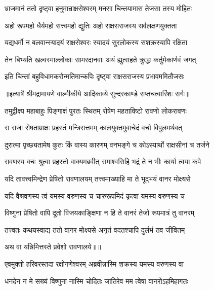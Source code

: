 \twolineshloka
{भ्राजमानं ततो दृष्ट्वा हनुमान्राक्षसेश्वरम्}
{मनसा चिन्तयामास तेजसा तस्य मोहितः} %

\twolineshloka
{अहो रूपमहो धैर्यमहो सत्त्वमहो द्युतिः}
{अहो राक्षसराजस्य सर्वलक्षणयुक्तता} %

\twolineshloka
{यद्यधर्मो न बलवान्स्यादयं राक्षसेश्वरः}
{स्यादयं सुरलोकस्य सशक्रस्यापि रक्षिता} %

\twolineshloka
{तेन बिभ्यति खल्वस्माल्लोकाः सामरदानवाः}
{अयं ह्युत्सहते क्रुद्धः कर्तुमेकार्णवं जगत्} %

\twolineshloka
{इति चिन्तां बहुविधामकरोन्मतिमान्कपिः}
{दृष्ट्वा राक्षसराजस्य प्रभावममितौजसः} %


{॥इत्यार्षे श्रीमद्रामायणे वाल्मीकीये आदिकाव्ये सुन्दरकाण्डे सप्तचत्वारिंशः सर्गः॥}


\twolineshloka
{तमुद्वीक्ष्य महाबाहुः पिङ्गाक्षं पुरतः स्थितम्}
{रोषेण महताविष्टो रावणो लोकरावणः} %

\twolineshloka
{स राजा रोषताम्राक्षः प्रहस्तं मन्त्रिसत्तमम्}
{कालयुक्तमुवाचेदं वचो विपुलमर्थवत्} %

\twolineshloka
{दुरात्मा पृच्छ्यतामेष कुतः किं वास्य कारणम्}
{वनभङ्गे च कोऽस्यार्थो राक्षसीनां च तर्जने} %

\twolineshloka
{रावणस्य वचः श्रुत्वा प्रहस्तो वाक्यमब्रवीत्}
{समाश्वसिहि भद्रं ते न भीः कार्या त्वया कपे} %

\twolineshloka
{यदि तावत्त्वमिन्द्रेण प्रेषितो रावणालयम्}
{तत्त्वमाख्याहि मा ते भूद्भयं वानर मोक्ष्यसे} %

\twolineshloka
{यदि वैश्रवणस्य त्वं यमस्य वरुणस्य च}
{चारुरूपमिदं कृत्वा यमस्य वरुणस्य च} %

\twolineshloka
{विष्णुना प्रेषितो वापि दूतो विजयकाङ्क्षिणा}
{न हि ते वानरं तेजो रूपमात्रं तु वानरम्} %

\twolineshloka
{तत्त्वतः कथयस्वाद्य ततो वानर मोक्ष्यसे}
{अनृतं वदतश्चापि दुर्लभं तव जीवितम्} %

{अथ वा यन्निमित्तस्ते प्रवेशो रावणालये॥॥} %

\addtocounter{shlokacount}{1}

\twolineshloka
{एवमुक्तो हरिवरस्तदा रक्षोगणेश्वरम्}
{अब्रवीन्नास्मि शक्रस्य यमस्य वरुणस्य वा} %

\twolineshloka
{धनदेन न मे सख्यं विष्णुना नास्मि चोदितः}
{जातिरेव मम त्वेषा वानरोऽहमिहागतः} %

